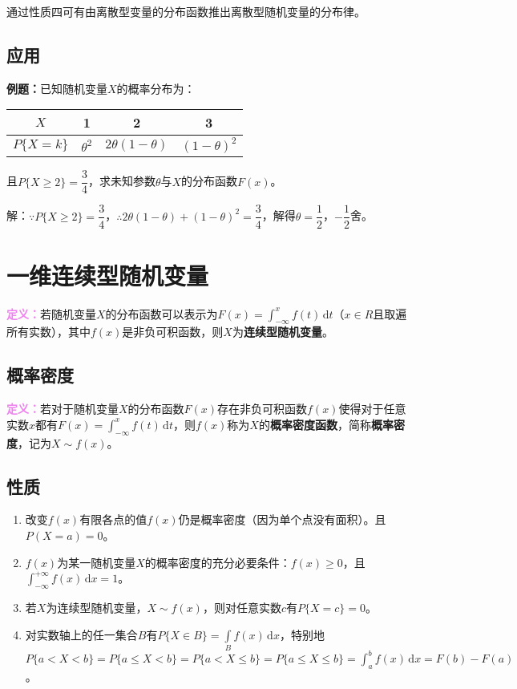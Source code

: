 \documentclass[UTF8, 12pt]{ctexart}
\begin{document}
通过性质四可有由离散型变量的分布函数推出离散型随机变量的分布律。

\subsection{应用}

\textbf{例题：}已知随机变量$X$的概率分布为：\medskip

\begin{tabular}{c|ccc}
    \hline
    $X$ & 1 & 2 & 3 \\ \hline
    $P\{X=k\}$ & $\theta^2$ & $2\theta(1-\theta)$ & $(1-\theta)^2$ \\
    \hline
\end{tabular} \medskip

且$P\{X\geqslant2\}=\dfrac{3}{4}$，求未知参数$\theta$与$X$的分布函数$F(x)$。

解：$\because P\{X\geqslant2\}=\dfrac{3}{4}$，$\therefore 2\theta(1-\theta)+(1-\theta)^2=\dfrac{3}{4}$，解得$\theta=\dfrac{1}{2}$，$-\dfrac{1}{2}$舍。

\section{一维连续型随机变量}

\textcolor{violet}{\textbf{定义：}}若随机变量$X$的分布函数可以表示为$F(x)=\int_{-\infty}^xf(t)\,\textrm{d}t$（$x\in R$且取遍所有实数），其中$f(x)$是非负可积函数，则$X$为\textbf{连续型随机变量}。

\subsection{概率密度}

\textcolor{violet}{\textbf{定义：}}若对于随机变量$X$的分布函数$F(x)$存在非负可积函数$f(x)$使得对于任意实数$x$都有$F(x)=\int_{-\infty}^xf(t)\,\textrm{d}t$，则$f(x)$称为$X$的\textbf{概率密度函数}，简称\textbf{概率密度}，记为$X\sim f(x)$。

\subsection{性质}

\begin{enumerate}
    \item 改变$f(x)$有限各点的值$f(x)$仍是概率密度（因为单个点没有面积）。且$P(X=a)=0$。
    \item $f(x)$为某一随机变量$X$的概率密度的充分必要条件：$f(x)\geqslant0$，且\\$\int_{-\infty}^{+\infty}f(x)\,\textrm{d}x=1$。
    \item 若$X$为连续型随机变量，$X\sim f(x)$，则对任意实数$c$有$P\{X=c\}=0$。
    \item 对实数轴上的任一集合$B$有$P\{X\in B\}=\int\limits_Bf(x)\,\textrm{d}x$，特别地$P\{a<X<b\}=P\{a\leqslant X<b\}=P\{a<X\leqslant b\}=P\{a\leqslant X\leqslant b\}=\int_a^bf(x)\,\textrm{d}x=F(b)-F(a)$。
\end{enumerate}
\end{document}
